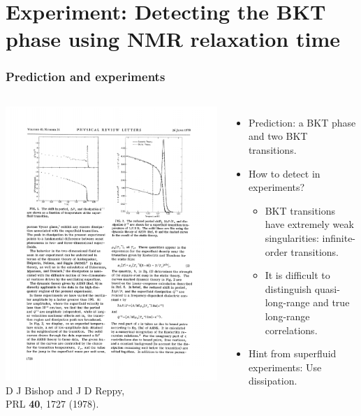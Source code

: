 \documentclass[xcolor=table, aspectratio=1610,ignorenonframetext]{beamer}
\begin{document}
\section{Experiment: Detecting the BKT phase using NMR relaxation time}

\begin{frame}
  \frametitle{Prediction and experiments}
  \begin{columns}
    \includegraphics[scale=.8]{dissipation}
    {\footnotesize D J Bishop and J D Reppy,\\ PRL \textbf{40}, 1727 (1978).}
    \begin{itemize}
      \item Prediction: a BKT phase and two BKT transitions.
      \item How to detect in experiments?
      \begin{itemize}
        \item BKT transitions have extremely weak singularities: infinite-order transitions.
        \item It is difficult to distinguish quasi-long-range and true long-range correlations.
      \end{itemize}
      \item Hint from superfluid experiments: Use dissipation.
    \end{itemize}
  \end{columns}
\end{frame}
\end{document}
